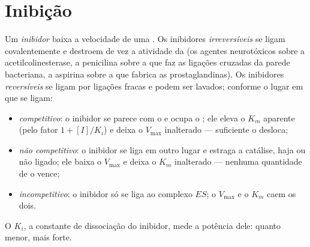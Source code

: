 \section{Inibição}

\begin{definition}[Inibidores]\label{def:b1:enzymes:inhibitors}
Um \emph{inibidor} baixa a velocidade de uma
. Os inibidores \emph{irreversíveis} se ligam covalentemente e
destroem de vez a atividade da  (os agentes neurotóxicos sobre a
acetilcolinesterase, a penicilina sobre a  que faz as ligações
cruzadas da parede bacteriana, a aspirina sobre a  que fabrica as
prostaglandinas). Os inibidores \emph{reversíveis} se ligam por ligações
fracas e podem ser lavados; conforme o lugar em que se ligam:
\begin{itemize}
  \item \emph{competitivo}: o inibidor se
        parece com o  e ocupa o ; ele eleva o $K_m$
        aparente (pelo fator $1 + [I]/K_i$) e deixa o $V_{\max}$
        inalterado ---  suficiente o desloca;
  \item \emph{não competitivo}: o inibidor se liga em outro lugar e
        estraga a catálise, haja ou não  ligado; ele baixa o
        $V_{\max}$ e deixa o $K_m$ inalterado --- nenhuma quantidade de
         o vence;
  \item \emph{incompetitivo}: o inibidor só se liga ao complexo $ES$; o
        $V_{\max}$ e o $K_m$ caem os dois.
\end{itemize}
O $K_i$, a constante de dissociação do inibidor, mede a potência dele:
quanto menor, mais forte.
\end{definition}

